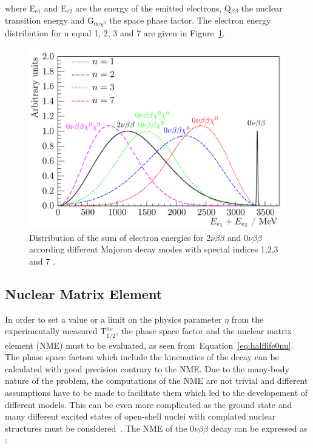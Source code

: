 \documentclass[main.tex]{subfiles}
\begin{document}
\NI where E$_{\text{e1}}$ and E$_{\text{e2}}$ are the energy of the emitted electrons, Q$_{\beta\beta}$ the nuclear transition energy and G$_{\text{0}\nu\chi^\text{0}}$ the space phase factor. The electron energy distribution for n equal 1, 2, 3 and 7 are given in Figure~\ref{DifferentbbDecaySpectrum}.


\bigskip


\begin{figure}[h!]
\begin{center}
\includegraphics[scale=0.30]{pictures/Chap2/MajoronEmissionElectronEnergySpectrum.png}
\caption{Distribution of the sum of electron energies for 2$\nu\beta\beta$ and 0$\nu\beta\beta$ according different Majoron decay modes with spectal indices 1,2,3 and 7 \cite{FatemiGhomiThesis}.}
\label{DifferentbbDecaySpectrum}
\end{center}
\end{figure}


\FloatBarrier


\subsection{Nuclear Matrix Element}\label{sec:NME}


\NI In order to set a value or a limit on the physics parameter $\eta$ from the experimentally measured T$_{\text{1/2}}^{\text{0}\nu}$, the phase space factor and the nuclear matrix element (NME) must to be evaluated, as seen from~Equation~\ref{eq:halflife0nu}. The phase space factors which include the kinematics of the decay can be calculated with good precision contrary to the NME. Due to the many-body nature of the problem, the computations of the NME are not trivial and different assumptions have to be made to facilitate them which led to the developement of different models. This can be even more complicated as the ground state and many different excited states of open-shell nuclei with complated nuclear structures must be considered~\cite{TheoryOfNeutrinolessDBD}. The NME of the 0$\nu\beta\beta$ decay can be expressed as :
\end{document}
